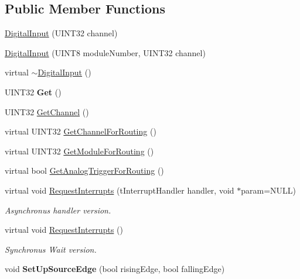\subsection*{Public Member Functions}
\begin{DoxyCompactItemize}
\item 
\hyperlink{classDigitalInput_a7f4562a0d04285cd07a85b2700a3522f}{DigitalInput} (UINT32 channel)
\item 
\hyperlink{classDigitalInput_a01af021e9b93ab74da0186895546e000}{DigitalInput} (UINT8 moduleNumber, UINT32 channel)
\item 
virtual \hyperlink{classDigitalInput_a7fb442a9bba43bdf7303504441d1569e}{$\sim$DigitalInput} ()
\item 
\hypertarget{classDigitalInput_a6852f9fdbe7aa8221d6e16675b884d44}{
UINT32 {\bfseries Get} ()}
\label{classDigitalInput_a6852f9fdbe7aa8221d6e16675b884d44}

\item 
UINT32 \hyperlink{classDigitalInput_a75b989a787a5b822903f24765330fcea}{GetChannel} ()
\item 
virtual UINT32 \hyperlink{classDigitalInput_a040ad3adde43d5ca89cfde006513fdcd}{GetChannelForRouting} ()
\item 
virtual UINT32 \hyperlink{classDigitalInput_a4401dc554ebab68503196e596c58255e}{GetModuleForRouting} ()
\item 
virtual bool \hyperlink{classDigitalInput_a670ae66c6f29cfe52e58e81068e0734d}{GetAnalogTriggerForRouting} ()
\item 
virtual void \hyperlink{classDigitalInput_ade30372b4bd2355ffdab5c38759d1901}{RequestInterrupts} (tInterruptHandler handler, void $\ast$param=NULL)
\begin{DoxyCompactList}\small\item\em Asynchronus handler version. \end{DoxyCompactList}\item 
virtual void \hyperlink{classDigitalInput_add5d16083baeab64fbd62069b83e7e1a}{RequestInterrupts} ()
\begin{DoxyCompactList}\small\item\em Synchronus Wait version. \end{DoxyCompactList}\item 
\hypertarget{classDigitalInput_ab53b8614e977073f11f601d484951349}{
void {\bfseries SetUpSourceEdge} (bool risingEdge, bool fallingEdge)}
\label{classDigitalInput_ab53b8614e977073f11f601d484951349}

\end{DoxyCompactItemize}


